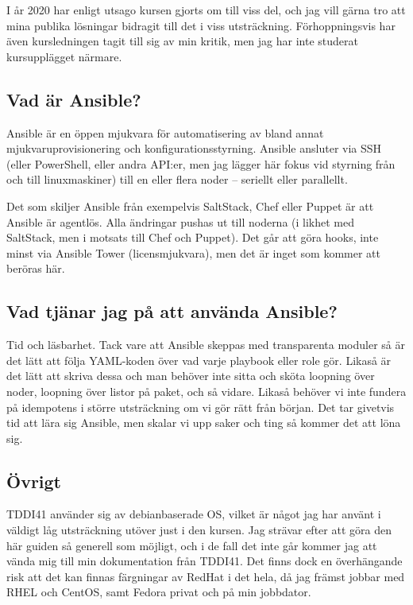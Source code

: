 I år 2020 har enligt utsago kursen gjorts om till viss del, och jag vill gärna tro att mina publika lösningar bidragit till det i viss utsträckning. Förhoppningsvis har även kursledningen tagit till sig av min kritik, men jag har inte studerat kursupplägget närmare.

\subsection{Vad är Ansible?}
Ansible är en öppen mjukvara för automatisering av bland annat mjukvaruprovisionering och konfigurationsstyrning. Ansible ansluter via SSH (eller PowerShell, eller andra API:er, men jag lägger här fokus vid styrning från och till linuxmaskiner) till en eller flera noder -- seriellt eller parallellt.

Det som skiljer Ansible från exempelvis SaltStack, Chef eller Puppet är att Ansible är agentlös. Alla ändringar pushas ut till noderna (i likhet med SaltStack, men i motsats till Chef och Puppet). Det går att göra hooks, inte minst via Ansible Tower (licensmjukvara), men det är inget som kommer att beröras här.

\subsection{Vad tjänar jag på att använda Ansible?}
Tid och läsbarhet. Tack vare att Ansible skeppas med transparenta moduler så är det lätt att följa YAML-koden över vad varje playbook eller role gör. 
Likaså är det lätt att skriva dessa och man behöver inte sitta och sköta loopning över noder, loopning över listor på paket, och så vidare. Likaså behöver vi inte fundera på idempotens i större utsträckning om vi gör rätt från början.
Det tar givetvis tid att lära sig Ansible, men skalar vi upp saker och ting så kommer det att löna sig.

\subsection{Övrigt}
TDDI41 använder sig av debianbaserade OS, vilket är något jag har använt i väldigt låg utsträckning utöver just i den kursen. Jag strävar efter att göra den här guiden så generell som möjligt, och i de fall det inte går
kommer jag att vända mig till min dokumentation från TDDI41. Det finns dock en överhängande risk att det kan finnas färgningar av RedHat i det hela, då jag främst jobbar med RHEL och CentOS, samt Fedora privat och på min jobbdator.
